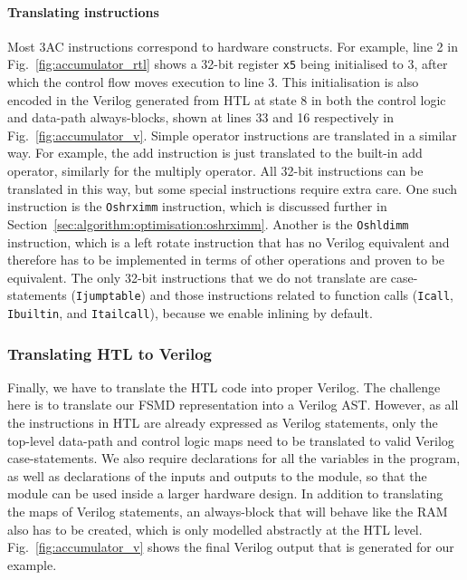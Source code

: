 \paragraph{Translating instructions}

Most 3AC instructions correspond to hardware constructs.
For example, line 2 in Fig.~\ref{fig:accumulator_rtl} shows a 32-bit register \texttt{x5} being initialised to 3, after which the control flow moves execution to line 3. This initialisation is also encoded in the Verilog generated from HTL at state 8 in both the control logic and data-path always-blocks, shown at lines 33 and 16 respectively in Fig.~\ref{fig:accumulator_v}.  Simple operator instructions are translated in a similar way.  For example, the add instruction is just translated to the built-in add operator, similarly for the multiply operator.  All 32-bit instructions can be translated in this way, but some special instructions require extra care. One such instruction is the \texttt{Oshrximm} instruction, which is discussed further in Section~\ref{sec:algorithm:optimisation:oshrximm}. Another is the \texttt{Oshldimm} instruction, which is a left rotate instruction that has no Verilog equivalent and therefore has to be implemented in terms of other operations and proven to be equivalent.
The only 32-bit instructions that we do not translate are case-statements (\texttt{Ijumptable}) and those instructions related to function calls (\texttt{Icall}, \texttt{Ibuiltin}, and \texttt{Itailcall}), because we enable inlining by default.

\subsubsection{Translating HTL to Verilog}

Finally, we have to translate the HTL code into proper Verilog. %
The challenge here is to translate our FSMD representation into a Verilog AST.  However, as all the instructions in HTL are already expressed as Verilog statements, only the top-level data-path and control logic maps need to be translated to valid Verilog case-statements.  We also require declarations for all the variables in the program, as well as declarations of the inputs and outputs to the module, so that the module can be used inside a larger hardware design.  In addition to translating the maps of Verilog statements, an always-block that will behave like the RAM also has to be created, which is only modelled abstractly at the HTL level.
Fig.~\ref{fig:accumulator_v} shows the final Verilog output that is generated for our example.

